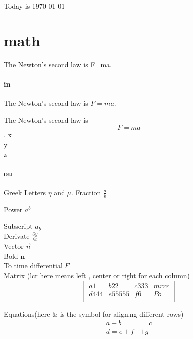 \documentclass[a4paper,11pt]{book} %
\begin{document}
Today is \today


	\section{math}The Newton's second law is F=ma. %

	\paragraph{in} The Newton's second law is $F=ma$. %

	The Newton's second law is \[F=ma\].  %
	x\\
	y\\
	z

	\paragraph{ou}
	Greek Letters $\eta$ and $\mu$.
	Fraction $\frac{a}{b}$

	Power $a^b$

	Subscript $a_b$\\
	Derivate $\frac{\partial y}{\partial t}$\\
	Vector $\vec{n}$\\
	Bold $\mathbf{n}$\\
	To time differential $\dot{F}$\\
	Matrix (lcr here means left , center or right for each column)
	\[
		\left[
			\begin{array}{llcr}
				a1 & b22 & c333 & mrrr\\
				d444 & e55555 & f6 & Po\\
			\end{array}
		\right]
	\]

	Equations(here \& is the symbol for aligning different rows)
	\begin{align}
		a+b&=c\\
		d=e+f&+g
	\end{align}
\end{document}
